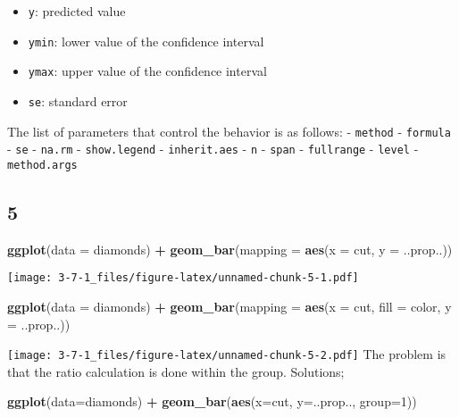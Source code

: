 \documentclass[]{article}
\newenvironment{Shaded}{\begin{snugshade}}{\end{snugshade}}
\newcommand{\DataTypeTok}[1]{\textcolor[rgb]{0.13,0.29,0.53}{#1}}
\newcommand{\DecValTok}[1]{\textcolor[rgb]{0.00,0.00,0.81}{#1}}
\newcommand{\KeywordTok}[1]{\textcolor[rgb]{0.13,0.29,0.53}{\textbf{#1}}}
\newcommand{\NormalTok}[1]{#1}
\newcommand{\OperatorTok}[1]{\textcolor[rgb]{0.81,0.36,0.00}{\textbf{#1}}}
\newcommand{\StringTok}[1]{\textcolor[rgb]{0.31,0.60,0.02}{#1}}
\providecommand{\tightlist}{%
  \setlength{\itemsep}{0pt}\setlength{\parskip}{0pt}}
\begin{document}
\begin{itemize}
\tightlist
\item
  \texttt{y}: predicted value
\item
  \texttt{ymin}: lower value of the confidence interval
\item
  \texttt{ymax}: upper value of the confidence interval
\item
  \texttt{se}: standard error
\end{itemize}

The list of parameters that control the behavior is as follows: -
\texttt{method} - \texttt{formula} - \texttt{se} - \texttt{na.rm} -
\texttt{show.legend} - \texttt{inherit.aes} - \texttt{n} - \texttt{span}
- \texttt{fullrange} - \texttt{level} - \texttt{method.args}

\hypertarget{section-5}{%
\subsection{5}\label{section-5}}

\begin{Shaded}
\begin{Highlighting}[]
\KeywordTok{ggplot}\NormalTok{(}\DataTypeTok{data =}\NormalTok{ diamonds) }\OperatorTok{+}\StringTok{ }
\StringTok{  }\KeywordTok{geom_bar}\NormalTok{(}\DataTypeTok{mapping =} \KeywordTok{aes}\NormalTok{(}\DataTypeTok{x =}\NormalTok{ cut, }\DataTypeTok{y =}\NormalTok{ ..prop..))}
\end{Highlighting}
\end{Shaded}

\texttt{[image: 3-7-1\_files/figure-latex/unnamed-chunk-5-1.pdf]}

\begin{Shaded}
\begin{Highlighting}[]
\KeywordTok{ggplot}\NormalTok{(}\DataTypeTok{data =}\NormalTok{ diamonds) }\OperatorTok{+}\StringTok{ }
\StringTok{  }\KeywordTok{geom_bar}\NormalTok{(}\DataTypeTok{mapping =} \KeywordTok{aes}\NormalTok{(}\DataTypeTok{x =}\NormalTok{ cut, }\DataTypeTok{fill =}\NormalTok{ color, }\DataTypeTok{y =}\NormalTok{ ..prop..))}
\end{Highlighting}
\end{Shaded}

\texttt{[image: 3-7-1\_files/figure-latex/unnamed-chunk-5-2.pdf]} The
problem is that the ratio calculation is done within the group.
Solutions;

\begin{Shaded}
\begin{Highlighting}[]
\KeywordTok{ggplot}\NormalTok{(}\DataTypeTok{data=}\NormalTok{diamonds) }\OperatorTok{+}\StringTok{ }
\StringTok{    }\KeywordTok{geom_bar}\NormalTok{(}\KeywordTok{aes}\NormalTok{(}\DataTypeTok{x=}\NormalTok{cut, }\DataTypeTok{y=}\NormalTok{..prop.., }\DataTypeTok{group=}\DecValTok{1}\NormalTok{))}
\end{Highlighting}
\end{Shaded}
\end{document}
